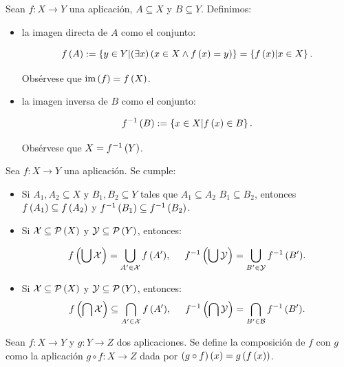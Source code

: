 \begin{definition}
\rm Sean $f:X\rightarrow Y$ una aplicación, $A\subseteq X$ y $B\subseteq Y$. Definimos:

\begin{itemize}
    \item la imagen directa de $A$ como el conjunto:

    \begin{equation}
        f\left(A\right):=\left\{y\in Y\middle|\left(\exists x\right)\left(x\in X\land f\left(x\right)=y\right)\right\}=\left\{f\left(x\right)\middle|x\in X\right\}.
    \end{equation}

    Obsérvese que $\text{im}\left(f\right)=f\left(X\right)$.
    \item la imagen inversa de $B$ como el conjunto:

    \begin{equation}
        f^{-1}\left(B\right):=\left\{x\in X\middle|f\left(x\right)\in B\right\}.
    \end{equation}

    
    Obsérvese que $X=f^{-1}\left(Y\right)$.
\end{itemize}
\end{definition}

\begin{proposition}
\rm Sea $f:X\rightarrow Y$ una aplicación. Se cumple:

\begin{itemize}
    \item[1.] Si $A_1, A_2\subseteq X$ y $B_1,B_2\subseteq Y$ tales que $A_1\subseteq A_2$ $B_1\subseteq B_2$, entonces $f\left(A_1\right)\subseteq f\left(A_2\right)$ y $f^{-1}\left(B_1\right)\subseteq f^{-1}\left(B_2\right)$.
    \item[2.] Si $\mathcal{X}\subseteq\mathcal{P}\left(X\right)$ y $\mathcal{Y}\subseteq\mathcal{P}\left(Y\right)$, entonces:
    
    \begin{equation}
        f\left(\bigcup{\mathcal{X}}\right)=\bigcup_{A'\in\mathcal{X}}{f\left(A'\right)},\hspace{0.5cm}  f^{-1}\left(\bigcup{\mathcal{Y}}\right)=\bigcup_{B'\in\mathcal{Y}}{f^{-1}\left(B'\right)}.
    \end{equation}
    \item[3.] Si $\mathcal{X}\subseteq\mathcal{P}\left(X\right)$ y $\mathcal{Y}\subseteq\mathcal{P}\left(Y\right)$, entonces:
    \begin{equation}
        f\left(\bigcap{\mathcal{X}}\right)\subseteq\bigcap_{A'\in\mathcal{X}}{f\left(A'\right)}, \hspace{0.5cm} f^{-1}\left(\bigcap{\mathcal{Y}}\right)=\bigcap_{B'\in\mathcal{B}}{f^{-1}\left(B'\right)}. 
    \end{equation}
  \end{itemize}
\end{proposition}
\begin{definition}
  \rm Sean $f:X\rightarrow Y$ y $g:Y\rightarrow Z$ dos aplicaciones. Se define la composición de $f$ con $g$ como la aplicación $g\circ f:X\rightarrow Z$ dada por $\left(g\circ f\right)\left(x\right)=g\left(f\left(x\right)\right)$.
\end{definition}

